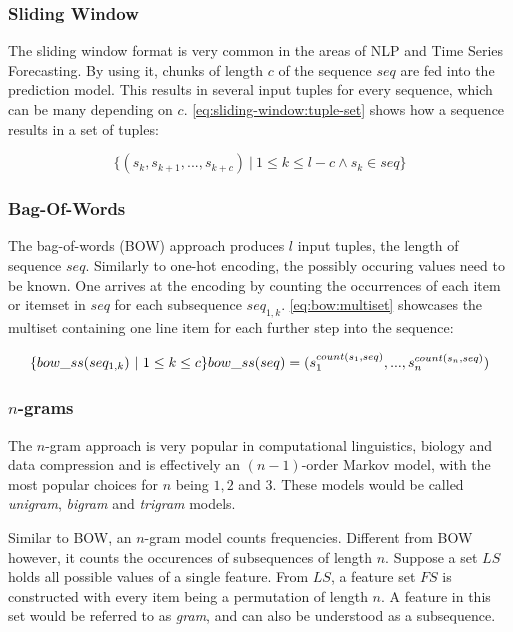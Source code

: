 \subsubsection*{Sliding Window}
The sliding window format is very common in the areas of NLP and Time Series Forecasting. By using it, chunks of length $c$ of the sequence $seq$ are fed into the prediction model. This results in several input tuples for every sequence, which can be many depending on $c$. \autoref{eq:sliding-window:tuple-set} shows how a sequence results in a set of tuples:

\begin{equation}
    \label{eq:sliding-window:tuple-set}
    \{ (s_k, s_{k+1}, ..., s_{k+c})\ |\ 1 \leq k \leq l-c \wedge s_k \in seq \}
\end{equation}

\subsubsection*{Bag-Of-Words}
The bag-of-words (BOW) approach produces $l$ input tuples, the length of sequence $seq$. Similarly to one-hot encoding, the possibly occuring values need to be known. One arrives at the encoding by counting the occurrences of each item or itemset in $seq$ for each subsequence $seq_{1,k}$. \autoref{eq:bow:multiset} showcases the multiset containing one line item for each further step into the sequence:

\begin{equation}
    \label{eq:bow:multiset}
    \{ bow\_ss(seq_{1,k})\ |\ 1 \leq k \leq c \} \\
    bow\_ss(seq) = ( s_1^{count(s_1,seq)}, ..., s_n^{count(s_n,seq)} )
\end{equation}

\subsubsection*{$n$-grams}
The $n$-gram approach is very popular in computational linguistics, biology and data compression and is effectively an $(n-1)$-order Markov model, with the most popular choices for $n$ being $1,2$ and $3$. These models would be called \textit{unigram}, \textit{bigram} and \textit{trigram} models.

Similar to BOW, an $n$-gram model counts frequencies. Different from BOW however, it counts the occurences of subsequences of length $n$. Suppose a set $LS$ holds all possible values of a single feature. From $LS$, a feature set $FS$ is constructed with every item being a permutation of length $n$. A feature in this set would be referred to as \textit{gram}, and can also be understood as a subsequence.

